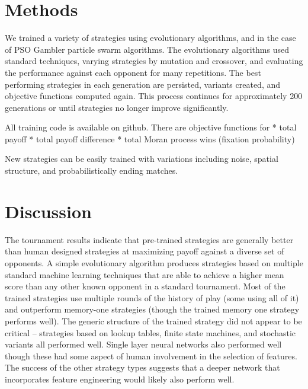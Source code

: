 \documentclass{article}
\begin{document}

\section{Methods}

We trained a variety of strategies using evolutionary algorithms, and in the
case of PSO Gambler particle swarm algorithms. The evolutionary algorithms
used standard techniques, varying strategies by mutation and crossover, and
evaluating the performance against each opponent for many repetitions. The
best performing strategies in each generation are persisted, variants created,
and objective functions computed again. This process continues for approximately
200 generations or until strategies no longer improve significantly.


All training code is available on github. There are objective functions for
* total payoff
* total payoff difference
* total Moran process wins (fixation probability)

New strategies can be easily trained with variations including noise, spatial
structure, and probabilistically ending matches.

\section{Discussion}

The tournament results indicate that pre-trained strategies are generally better
than human designed strategies at maximizing payoff against a diverse set of
opponents. A simple evolutionary algorithm produces strategies based on multiple
standard machine learning techniques that are able to achieve a higher mean
score than any other known opponent in a standard tournament. Most of the trained
strategies use multiple rounds of the history of play (some using all of it) and
outperform memory-one strategies (though the trained memory one strategy performs
well). The generic structure of the trained strategy did not appear to be
critical -- strategies based on lookup tables, finite state machines, and stochastic
variants all performed well. Single layer neural networks also performed well
though these had some aspect of human involvement in the selection of features.
The success of the other strategy types suggests that a deeper network that
incorporates feature engineering would likely also perform well.
\end{document}
